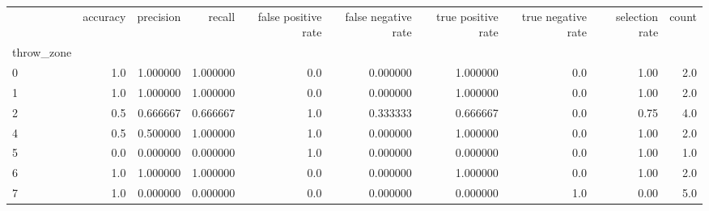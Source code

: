 \begin{tabular}{lrrrrrrrrr}
\toprule
{} &  accuracy &  precision &    recall &  false positive rate &  false negative rate &  true positive rate &  true negative rate &  selection rate &  count \\
throw\_zone &           &            &           &                      &                      &                     &                     &                 &        \\
\midrule
0          &       1.0 &   1.000000 &  1.000000 &                  0.0 &             0.000000 &            1.000000 &                 0.0 &            1.00 &    2.0 \\
1          &       1.0 &   1.000000 &  1.000000 &                  0.0 &             0.000000 &            1.000000 &                 0.0 &            1.00 &    2.0 \\
2          &       0.5 &   0.666667 &  0.666667 &                  1.0 &             0.333333 &            0.666667 &                 0.0 &            0.75 &    4.0 \\
4          &       0.5 &   0.500000 &  1.000000 &                  1.0 &             0.000000 &            1.000000 &                 0.0 &            1.00 &    2.0 \\
5          &       0.0 &   0.000000 &  0.000000 &                  1.0 &             0.000000 &            0.000000 &                 0.0 &            1.00 &    1.0 \\
6          &       1.0 &   1.000000 &  1.000000 &                  0.0 &             0.000000 &            1.000000 &                 0.0 &            1.00 &    2.0 \\
7          &       1.0 &   0.000000 &  0.000000 &                  0.0 &             0.000000 &            0.000000 &                 1.0 &            0.00 &    5.0 \\
\bottomrule
\end{tabular}
